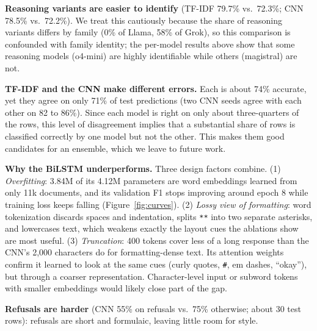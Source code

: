 \documentclass[11pt]{article}
\newcommand{\pct}[1]{#1\%}
\begin{document}
\textbf{Reasoning variants are easier to identify} (TF-IDF \pct{79.7} vs.\ \pct{72.3}; CNN \pct{78.5} vs.\ \pct{72.2}). We treat this cautiously because the share of reasoning variants differs by family (0\% of Llama, 58\% of Grok), so this comparison is confounded with family identity; the per-model results above show that some reasoning models (o4-mini) are highly identifiable while others (magistral) are not.

\textbf{TF-IDF and the CNN make different errors.} Each is about \pct{74} accurate, yet they agree on only \pct{71} of test predictions (two CNN seeds agree with each other on 82 to \pct{86}). Since each model is right on only about three-quarters of the rows, this level of disagreement implies that a substantial share of rows is classified correctly by one model but not the other. This makes them good candidates for an ensemble, which we leave to future work.

\textbf{Why the BiLSTM underperforms.} Three design factors combine. (1) \emph{Overfitting}: 3.84M of its 4.12M parameters are word embeddings learned from only 11k documents, and its validation F1 stops improving around epoch 8 while training loss keeps falling (Figure~\ref{fig:curves}). (2) \emph{Lossy view of formatting}: word tokenization discards spaces and indentation, splits \texttt{**} into two separate asterisks, and lowercases text, which weakens exactly the layout cues the ablations show are most useful. (3) \emph{Truncation}: 400 tokens cover less of a long response than the CNN's 2{,}000 characters do for formatting-dense text. Its attention weights confirm it learned to look at the same cues (curly quotes, \texttt{\#}, em dashes, ``okay''), but through a coarser representation. Character-level input or subword tokens with smaller embeddings would likely close part of the gap.

\textbf{Refusals are harder} (CNN \pct{55} on refusals vs.\ \pct{75} otherwise; about 30 test rows): refusals are short and formulaic, leaving little room for style.

\end{document}
